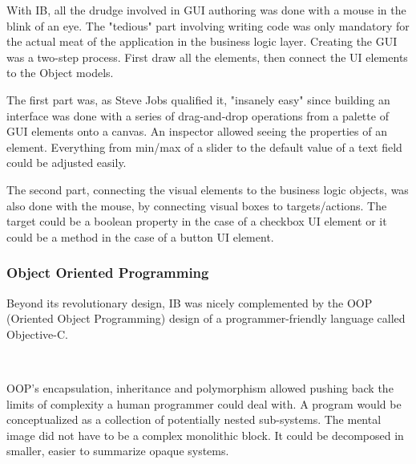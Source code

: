 \vspace{-4mm}
With IB, all the drudge involved in GUI authoring was done with a mouse in the blink of an eye. The "tedious" part involving writing code was only mandatory for the actual meat of the application in the business logic layer. Creating the GUI was a two-step process. First draw all the elements, then connect the UI elements to the Object models.\\
\par
The first part was, as Steve Jobs qualified it, "insanely easy" since building an interface was done with a series of drag-and-drop operations from a palette of GUI elements onto a canvas. An inspector allowed seeing the properties of an element. Everything from min/max of a slider to the default value of a text field could be adjusted easily.\\
\par
The second part, connecting the visual elements to the business logic objects, was also done with the mouse, by connecting visual boxes to targets/actions. The target could be a boolean property in the case of a checkbox UI element or it could be a method in the case of a button UI element.

\subsubsection{Object Oriented Programming}
Beyond its revolutionary design, IB was nicely complemented by the OOP (Oriented Object Programming) design of a programmer-friendly language called Objective-C.\\
\par
{}\\
\par
OOP's encapsulation, inheritance and polymorphism allowed pushing back the limits of complexity a human programmer could deal with. A program would be conceptualized as a collection of potentially nested sub-systems. The mental image did not have to be a complex monolithic block. It could be decomposed in smaller, easier to summarize opaque systems.\\

